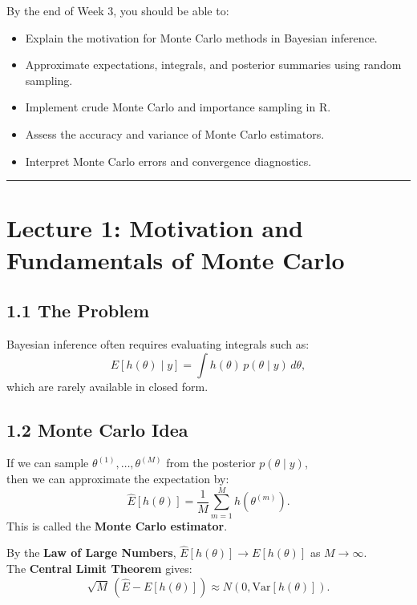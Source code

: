 \documentclass[
  letterpaper,
  DIV=11,
  numbers=noendperiod]{scrreprt}
\providecommand{\tightlist}{%
  \setlength{\itemsep}{0pt}\setlength{\parskip}{0pt}}
\begin{document}
By the end of Week 3, you should be able to:

\begin{itemize}
\tightlist
\item
  Explain the motivation for Monte Carlo methods in Bayesian
  inference.\\
\item
  Approximate expectations, integrals, and posterior summaries using
  random sampling.\\
\item
  Implement crude Monte Carlo and importance sampling in R.\\
\item
  Assess the accuracy and variance of Monte Carlo estimators.\\
\item
  Interpret Monte Carlo errors and convergence diagnostics.
\end{itemize}

\begin{center}\rule{0.5\linewidth}{0.5pt}\end{center}

\section{Lecture 1: Motivation and Fundamentals of Monte
Carlo}\label{lecture-1-motivation-and-fundamentals-of-monte-carlo}

\subsection{1.1 The Problem}\label{the-problem}

Bayesian inference often requires evaluating integrals such as: \[
E[h(\theta) \mid y] = \int h(\theta)\, p(\theta \mid y)\, d\theta,
\] which are rarely available in closed form.

\subsection{1.2 Monte Carlo Idea}\label{monte-carlo-idea}

If we can sample \(\theta^{(1)}, \ldots, \theta^{(M)}\) from the
posterior \(p(\theta \mid y)\),\\
then we can approximate the expectation by: \[
\hat{E}[h(\theta)] = \frac{1}{M} \sum_{m=1}^M h(\theta^{(m)}).
\] This is called the \textbf{Monte Carlo estimator}.

By the \textbf{Law of Large Numbers},
\(\hat{E}[h(\theta)] \to E[h(\theta)]\) as \(M \to \infty\).\\
The \textbf{Central Limit Theorem} gives: \[
\sqrt{M}\,(\hat{E} - E[h(\theta)]) \approx N(0, \text{Var}[h(\theta)]).
\]
\end{document}
